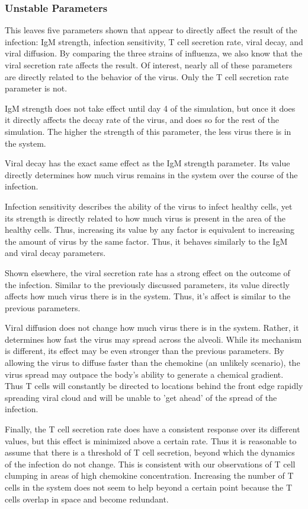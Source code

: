 \documentclass[10pt]{article}
\begin{document}
\subsubsection*{Unstable Parameters}

This leaves five parameters shown that appear to directly affect the result of the infection: IgM strength, infection sensitivity, T cell secretion rate, viral decay, and viral diffusion.  By comparing the three strains of influenza, we also know that the viral secretion rate affects the result.  Of interest, nearly all of these parameters are directly related to the behavior of the virus.  Only the T cell secretion rate parameter is not.  

IgM strength does not take effect until day 4 of the simulation, but once it does it directly affects the decay rate of the virus, and does so for the rest of the simulation.  The higher the strength of this parameter, the less virus there is in the system.

Viral decay has the exact same effect as the IgM strength parameter.  Its value directly determines how much virus remains in the system over the course of the infection.

Infection sensitivity describes the ability of the virus to infect healthy cells, yet its strength is directly related to how much virus is present in the area of the healthy cells.  Thus, increasing its value by any factor is equivalent to increasing the amount of virus by the same factor.  Thus, it behaves similarly to the IgM and viral decay parameters.

Shown elsewhere, the viral secretion rate has a strong effect on the outcome of the infection.  Similar to the previously discussed parameters, its value directly affects how much virus there is in the system.  Thus, it's affect is similar to the previous parameters.

Viral diffusion does not change how much virus there is in the system.  Rather, it determines how fast the virus may spread across the alveoli.  While its mechanism is different, its effect may be even stronger than the previous parameters.  By allowing the virus to diffuse faster than the chemokine (an unlikely scenario), the virus spread may outpace the body's ability to generate a chemical gradient.  Thus T cells will constantly be directed to locations behind the front edge rapidly spreading viral cloud and will be unable to 'get ahead' of the spread of the infection.

Finally, the T cell secretion rate does have a consistent response over its different values, but this effect is minimized above a certain rate.  Thus it is reasonable to assume that there is a threshold of T cell secretion, beyond which the dynamics of the infection do not change.  This is consistent with our observations of T cell clumping in areas of high chemokine concentration.  Increasing the number of T cells in the system does not seem to help beyond a certain point because the T cells overlap in space and become redundant.
\end{document}
